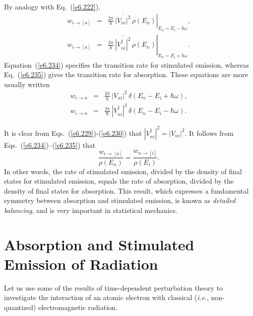 By analogy with Eq.~(\ref{e6.222}),
\begin{eqnarray}\label{e6.234}
w_{i\rightarrow [n]} &=&\left. \frac{2\pi}{\hbar} \,\overline{|V_{ni}|^2}\,\rho(E_n)
\right|_{E_n = E_i-\hbar\omega},\\[0.5ex]
w_{i\rightarrow [n]} &=&\left.  \frac{2\pi}{\hbar} \,\overline{
|V_{ni}^\dagger|^2}\,\rho(E_n)\right|_{E_n = E_i+\hbar\omega}.\label{e6.235}
\end{eqnarray}
Equation~(\ref{e6.234}) specifies the transition rate for stimulated emission, whereas
Eq.~(\ref{e6.235}) gives the transition rate for absorption. 
These equations are more usually written
\begin{eqnarray}
w_{i\rightarrow n} &=& \frac{2\pi}{\hbar} \,|V_{ni}|^2
\, \delta(E_n-E_i+\hbar\omega),\\[0.5ex]
w_{i\rightarrow n} &=&  \frac{2\pi}{\hbar} \,
|V_{ni}^\dagger|^2\,\delta(E_n -E_i-\hbar\omega).\label{e6.237}
\end{eqnarray}

It is clear from Eqs.~(\ref{e6.229})-(\ref{e6.230}) that $|V_{ni}^\dagger|^2 = |V_{ni}|^2$.
It follows from Eqs.~(\ref{e6.234})--(\ref{e6.235}) that
\begin{equation}
\frac{w_{i\rightarrow [n]}}{\rho(E_n)} = \frac{w_{n\rightarrow [i]}}{\rho(E_i)}.
\end{equation}
In other words, the rate of stimulated emission, divided by the density
of final states for stimulated emission, equals the rate of absorption,
 divided
by the density of final states for absorption. This result, which
expresses a fundamental symmetry between absorption and stimulated
emission, is known as {\em detailed balancing}, and is very important in
statistical mechanics. 

\section{Absorption and Stimulated Emission of Radiation}
Let us use some of the results of time-dependent perturbation theory
to investigate the interaction of an atomic electron with 
classical ({\em i.e.}, non-quantized) electromagnetic radiation. 

